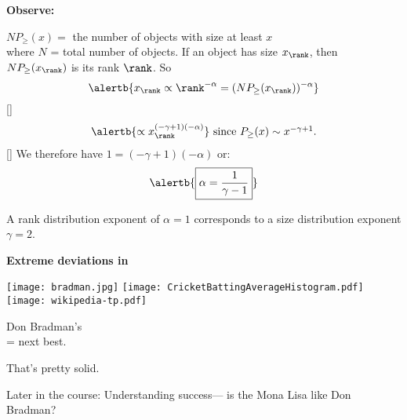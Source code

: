 
  \textbf{Observe:}
    
     $ NP_\ge(x) = $ the number of objects with size at least $x$\\
      where $N$ = total number of objects.
     If an object has size $x_\rank$, then $NP_\ge(x_\rank)$ is its rank $\rank$.
     So 
      $$\alertb{x_\rank \propto \rank^{-\alpha} = (NP_\ge(x_\rank))^{-\alpha}}$$
    [] 
      $$
      \alertb{ \propto x_\rank^{(-\gamma+1)(-\alpha)}}
      \mbox{\ since $P_\ge(x) \sim x^{-\gamma+1}$}.
      $$
    [] 
      We therefore have $1=(-\gamma+1)(-\alpha)$ or:
      $$
      \alertb{
        \boxed{\alpha = \frac{1}{\gamma-1}}
      }
      $$
     
      A rank distribution exponent of $\alpha = 1$ 
      corresponds to a size distribution exponent $\gamma=2$.
    
  




  \textbf{}

  \textbf{Extreme deviations in }
      
    \begin{center}
      \texttt{[image: bradman.jpg]}
      \texttt{[image: CricketBattingAverageHistogram.pdf]}
      \texttt{[image: wikipedia-tp.pdf]}
    \end{center}
    
    
      {Don Bradman's  \\ =  next best.}
    
      That's pretty solid.
    
      Later in the course: Understanding success--- \newline
      is the Mona Lisa like Don Bradman?
    
  


